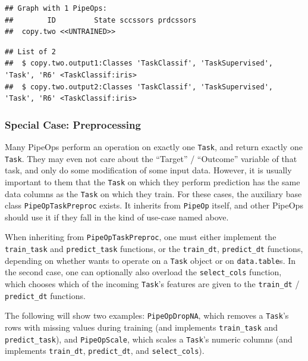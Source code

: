 \documentclass[]{article}
\newenvironment{Shaded}{\begin{snugshade}}{\end{snugshade}}
\newcommand{\KeywordTok}[1]{\textcolor[rgb]{0.13,0.29,0.53}{\textbf{#1}}}
\newcommand{\NormalTok}[1]{#1}
\newcommand{\OperatorTok}[1]{\textcolor[rgb]{0.81,0.36,0.00}{\textbf{#1}}}
\newcommand{\StringTok}[1]{\textcolor[rgb]{0.31,0.60,0.02}{#1}}
\renewenvironment{Shaded} {\begin{snugshade}\small} {\end{snugshade}}
\begin{document}
\begin{verbatim}
## Graph with 1 PipeOps:
##        ID         State sccssors prdcssors
##  copy.two <<UNTRAINED>>
\end{verbatim}

\begin{Shaded}
\end{Shaded}

\begin{verbatim}
## List of 2
##  $ copy.two.output1:Classes 'TaskClassif', 'TaskSupervised', 'Task', 'R6' <TaskClassif:iris> 
##  $ copy.two.output2:Classes 'TaskClassif', 'TaskSupervised', 'Task', 'R6' <TaskClassif:iris>
\end{verbatim}

\hypertarget{ext-pipe-preproc}{%
\subsubsection{Special Case: Preprocessing}\label{ext-pipe-preproc}}

Many PipeOps perform an operation on exactly one \texttt{Task}, and return exactly one \texttt{Task}. They may even not care about the ``Target'' / ``Outcome'' variable of that task, and only do some modification of some input data.
However, it is usually important to them that the \texttt{Task} on which they perform prediction has the same data columns as the \texttt{Task} on which they train.
For these cases, the auxiliary base class \texttt{PipeOpTaskPreproc} exists.
It inherits from \texttt{PipeOp} itself, and other PipeOps should use it if they fall in the kind of use-case named above.

When inheriting from \texttt{PipeOpTaskPreproc}, one must either implement the \texttt{train\_task} and \texttt{predict\_task} functions, or the \texttt{train\_dt}, \texttt{predict\_dt} functions, depending on whether wants to operate on a \texttt{Task} object or on \texttt{data.table}s.
In the second case, one can optionally also overload the \texttt{select\_cols} function, which chooses which of the incoming \texttt{Task}'s features are given to the \texttt{train\_dt} / \texttt{predict\_dt} functions.

The following will show two examples: \texttt{PipeOpDropNA}, which removes a \texttt{Task}'s rows with missing values during training (and implements \texttt{train\_task} and \texttt{predict\_task}), and \texttt{PipeOpScale}, which scales a \texttt{Task}'s numeric columns (and implements \texttt{train\_dt}, \texttt{predict\_dt}, and \texttt{select\_cols}).
\end{document}
